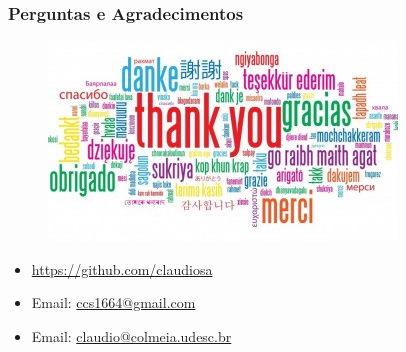\documentclass{beamer}
\begin{document}
\begin{frame} [fragile]
\frametitle{Perguntas e Agradecimentos}
  
  \begin{center}
   \begin{figure} [!ht]
   \includegraphics[scale=0.56,keepaspectratio]{figures/thank-you-cloud.jpg} 
   \end{figure}
  \end{center} 

\vspace{-1cm}

\begin{block}{}
  \begin{itemize}
  
  \item \url{https://github.com/claudiosa}
  
  \item Email: \url{ccs1664@gmail.com}
  
  \item Email: \url{claudio@colmeia.udesc.br}



  \end{itemize}
  \end{block}

\end{frame}
\end{document}
